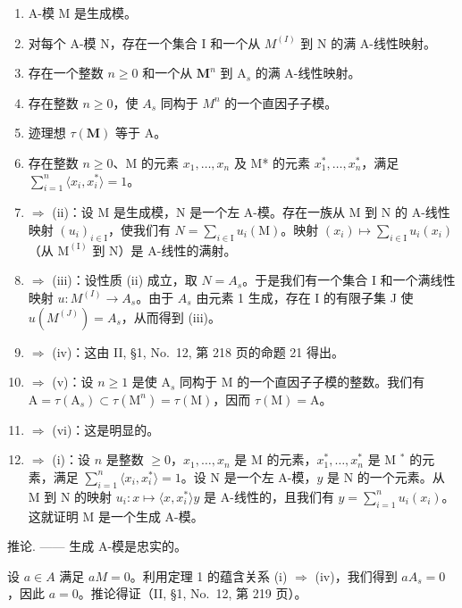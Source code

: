 \begin{enumerate}
\def\labelenumi{(\roman{enumi})}
\item
  A-模 M 是生成模。
\item
  对每个 A-模 N，存在一个集合 I 和一个从 \(M^{(I)}\) 到 N 的满 A-线性映射。
\item
  存在一个整数 \(n \geqslant 0\) 和一个从 \(\mathbf{M}^n\) 到 \(\mathrm{A}_s\) 的满 A-线性映射。
\item
  存在整数 \(n \geqslant 0\)，使 \(A_s\) 同构于 \(M^n\) 的一个直因子子模。
\item
  迹理想 \(\tau (\mathbf{M})\) 等于 A。
\item
  存在整数 \(n \geqslant 0\)、M 的元素 \(x_{1}, \ldots, x_{n}\) 及 M* 的元素 \(x_{1}^{*}, \ldots, x_{n}^{*}\)，满足 \(\sum_{i=1}^{n} \langle x_{i}, x_{i}^{*} \rangle = 1\)。
\item
  \(\Rightarrow\) (ii)：设 M 是生成模，N 是一个左 A-模。存在一族从 M 到 N 的 A-线性映射 \((u_{i})_{i\in\mathrm{I}}\)，使我们有 \(N=\sum_{i\in\mathrm{I}}u_{i}(\mathrm{M})\)。映射 \((x_{i})\mapsto\sum_{i\in\mathrm{I}}u_{i}(x_{i})\)（从 \(\mathrm{M}^{(\mathrm{I})}\) 到 N）是 A-线性的满射。
\item
  \(\Rightarrow\) (iii)：设性质 (ii) 成立，取 \(N = A_s\)。于是我们有一个集合 I 和一个满线性映射 \(u: M^{(I)} \to A_s\)。由于 \(A_s\) 由元素 1 生成，存在 I 的有限子集 J 使 \(u(M^{(J)}) = A_s\)，从而得到 (iii)。
\item
  \(\Rightarrow\) (iv)：这由 II, §1, No.~12, 第 218 页的命题 21 得出。
\item
  \(\Rightarrow\) (v)：设 \(n \geqslant 1\) 是使 \(\mathrm{A}_s\) 同构于 M 的一个直因子子模的整数。我们有 \(\mathrm{A} = \tau(\mathrm{A}_s) \subset \tau(\mathrm{M}^n) = \tau(\mathrm{M})\)，因而 \(\tau(\mathrm{M}) = \mathrm{A}\)。
\item
  \(\Rightarrow\) (vi)：这是明显的。
\item
  \(\Rightarrow\) (i)：设 \(n\) 是整数 \(\geqslant 0\)，\(x_{1},\ldots ,x_{n}\) 是 M 的元素，\(x_{1}^{*},\ldots ,x_{n}^{*}\) 是 M \(^*\) 的元素，满足 \(\sum_{i = 1}^{n}\langle x_i,x_i^*\rangle = 1\)。设 N 是一个左 A-模，\(y\) 是 N 的一个元素。从 M 到 N 的映射 \(u_{i}:x\mapsto \langle x,x_{i}^{*}\rangle y\) 是 A-线性的，且我们有 \(y = \sum_{i = 1}^{n}u_{i}(x_{i})\)。这就证明 M 是一个生成 A-模。
\end{enumerate}

推论. —— 生成 A-模是忠实的。

设 \(a \in A\) 满足 \(aM = 0\)。利用定理 1 的蕴含关系 (i) \(\Rightarrow\) (iv)，我们得到 \(aA_s = 0\)，因此 \(a = 0\)。推论得证（II, §1, No.~12, 第 219 页）。

